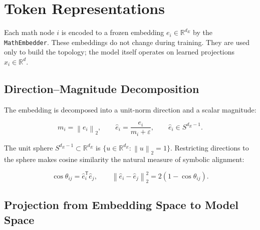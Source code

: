 \documentclass[11pt]{article}
\newcommand{\R}{\mathbb{R}}
\newcommand{\eps}{\varepsilon}
\newcommand{\norm}[1]{\left\lVert #1 \right\rVert}
\begin{document}
\section*{Token Representations}

Each math node $i$ is encoded to a frozen embedding $e_i \in \R^{d_E}$
by the \texttt{MathEmbedder}.  These embeddings do not change during
training.  They are used only to build the topology;
the model itself operates on learned projections $x_i \in \R^{d}$.

\subsection*{Direction--Magnitude Decomposition}

The embedding is decomposed into a unit-norm direction and a scalar magnitude:

\[
m_i = \norm{e_i}_2,
\qquad
\hat{e}_i = \frac{e_i}{m_i + \eps},
\qquad
\hat{e}_i \in S^{d_E - 1}.
\]

The unit sphere $S^{d_E - 1} \subset \R^{d_E}$ is
$\{u \in \R^{d_E} : \norm{u}_2 = 1\}$.
Restricting directions to the sphere makes cosine similarity the
natural measure of symbolic alignment:

\[
\cos\theta_{ij} = \hat{e}_i^{\mathsf{T}} \hat{e}_j,
\qquad
\norm{\hat{e}_i - \hat{e}_j}_2^2 = 2(1 - \cos\theta_{ij}).
\]

\begin{center}
\end{center}

\subsection*{Projection from Embedding Space to Model Space}
\end{document}
